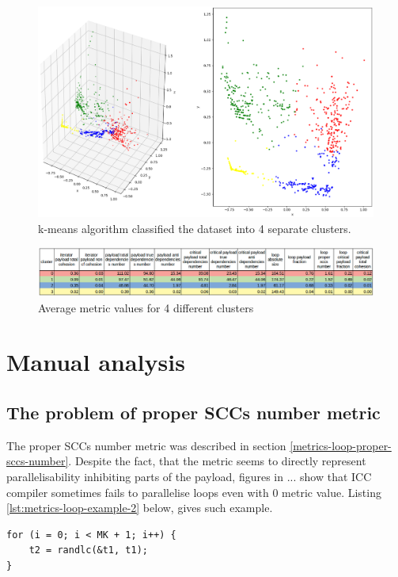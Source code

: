 \begin{figure}[htb]
\centering
\includegraphics[width=\linewidth]{figs/metrics-4-clusters.png}
\caption{k-means algorithm classified the dataset into 4 separate clusters.}
\label{metrics-4-clusters}
\end{figure}

\begin{figure}[htb]
\centering
\includegraphics[width=\linewidth]{figs/clusters-metric-values.png}
\caption{Average metric values for 4 different clusters}
\label{clusters-metric-values}
\end{figure} 

\section{Manual analysis}
\label{analysis-manual-analysis}

\subsection{The problem of proper SCCs number metric}
\qquad The proper SCCs number metric was described in section \ref{metrics-loop-proper-sccs-number}. Despite the fact, that the metric seems to directly represent parallelisability inhibiting parts of the payload, figures in ... show that ICC compiler sometimes fails to parallelise loops even with 0 metric value. Listing \ref{lst:metrics-loop-example-2} below, gives such example.

\begin{lstlisting}[caption={Non-parallelizible loop. Function call inside loop's body prevents ICC compiler from parallelizing it. Loop taken from EP NAS benchmark.}, captionpos=b, label=lst:metrics-loop-example-2, float,floatplacement=H]
for (i = 0; i < MK + 1; i++) {
	t2 = randlc(&t1, t1);
}
\end{lstlisting}

